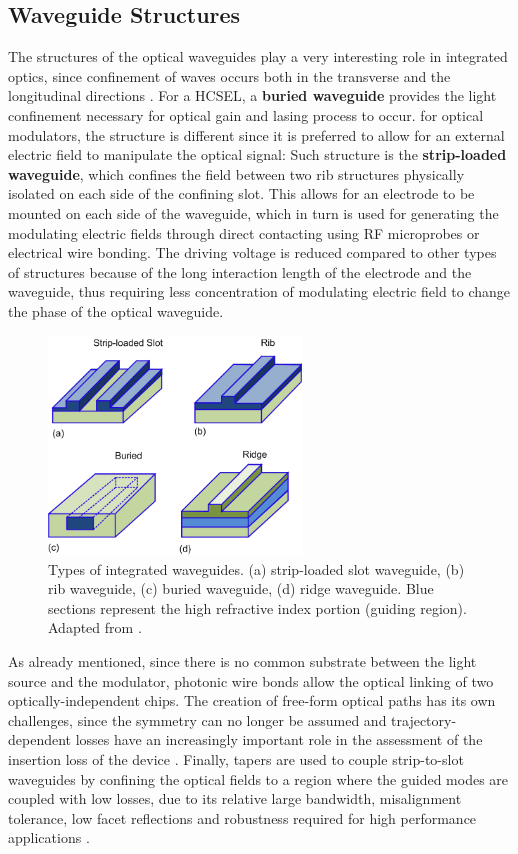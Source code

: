 \subsection{Waveguide Structures}
\label{sec:thbkgd:wg}
The structures of the optical waveguides play a very interesting role in integrated optics, since confinement of waves occurs both in the transverse and the longitudinal directions \cite{SelleriWG15}. For a HCSEL, a \textbf{buried waveguide} provides the light confinement necessary for optical gain and lasing process to occur. for optical modulators, the structure is different since it is preferred to allow for an external electric field to manipulate the optical signal: Such structure is the \textbf{strip-loaded waveguide}, which confines the field between two rib structures physically isolated on each side of the confining slot. This allows for an electrode to be mounted on each side of the waveguide, which in turn is used for generating the modulating electric fields through direct contacting using RF microprobes or electrical wire bonding. The driving voltage is reduced compared to other types of structures because of the long interaction length of the electrode and the waveguide, thus requiring less concentration of modulating electric field to change the phase of the optical waveguide. 

\begin{figure}[!ht]
\centering
  \includegraphics[width=0.6\textwidth]{visio/WGarten}
  \caption{Types of integrated waveguides. (a) strip-loaded slot waveguide, (b) rib waveguide, (c) buried waveguide, (d) ridge waveguide. Blue sections represent the high refractive index portion (guiding region). Adapted from \cite{SelleriWG15}.}
  \label{fig:SelleriWG}
\end{figure}
\par\medskip
As already mentioned, since there is no common substrate between the light source and the modulator, photonic wire bonds allow the optical linking of two optically-independent chips. The creation of free-form optical paths has its own challenges, since the symmetry can no longer be assumed and trajectory-dependent losses have an increasingly important role in the assessment of the insertion loss of the device \cite{ToepferPWB14}. Finally, tapers are used to couple strip-to-slot waveguides by confining the optical fields to a region where the guided modes are coupled with low losses, due to its relative large bandwidth, misalignment tolerance, low facet reflections and robustness required for high performance applications \cite{SPThourhout10} \cite{TapWGOnanuga14}. 


